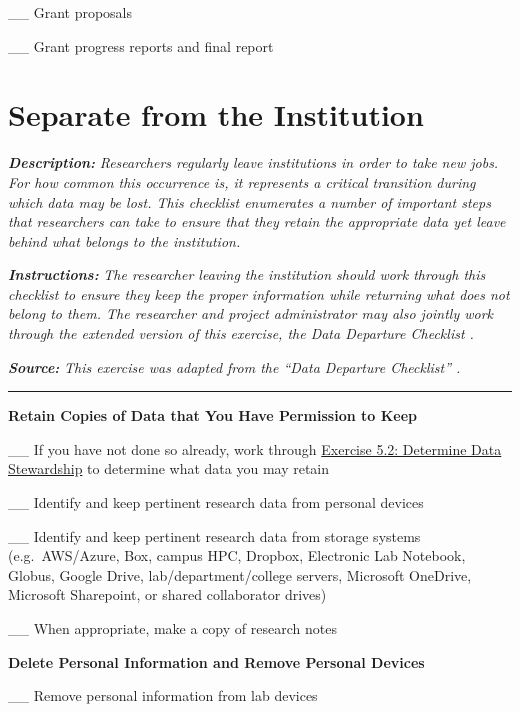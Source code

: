 \documentclass[
]{book}
\begin{document}
\_\_ Grant proposals

\_\_ Grant progress reports and final report

\hypertarget{separation}{%
\section{Separate from the Institution}\label{separation}}

\textbf{\emph{Description:}} \emph{Researchers regularly leave institutions in order to take new jobs. For how common this occurrence is, it represents a critical transition during which data may be lost. This checklist enumerates a number of important steps that researchers can take to ensure that they retain the appropriate data yet leave behind what belongs to the institution.}

\textbf{\emph{Instructions:}} \emph{The researcher leaving the institution should work through this checklist to ensure they keep the proper information while returning what does not belong to them. The researcher and project administrator may also jointly work through the extended version of this exercise, the Data Departure Checklist \citep{goben_data_2023}.}

\textbf{\emph{Source:}} \emph{This exercise was adapted from the ``Data Departure Checklist'' \citep{goben_data_2023}.}

\begin{center}\rule{0.5\linewidth}{0.5pt}\end{center}

\textbf{Retain Copies of Data that You Have Permission to Keep}

\_\_ If you have not done so already, work through \protect\hyperlink{data-governance}{Exercise 5.2: Determine Data Stewardship} to determine what data you may retain

\_\_ Identify and keep pertinent research data from personal devices

\_\_ Identify and keep pertinent research data from storage systems (e.g.~AWS/Azure, Box, campus HPC, Dropbox, Electronic Lab Notebook, Globus, Google Drive, lab/department/college servers, Microsoft OneDrive, Microsoft Sharepoint, or shared collaborator drives)

\_\_ When appropriate, make a copy of research notes

\textbf{Delete Personal Information and Remove Personal Devices}

\_\_ Remove personal information from lab devices
\end{document}
